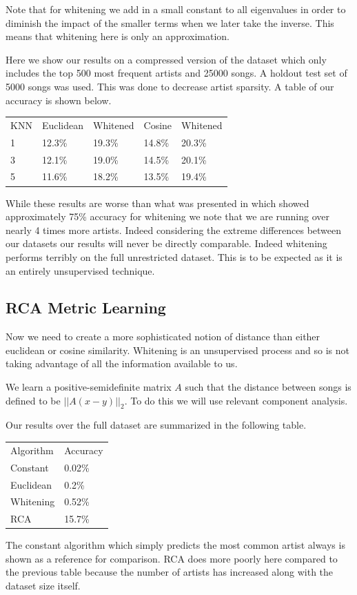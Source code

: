 \documentclass[a4paper,10pt]{article}
\begin{document}
Note that for whitening we add in a small constant to all eigenvalues in order to diminish the impact of the smaller terms when we later take the inverse. This means that whitening here is only an approximation. 

Here we show our results on a compressed version of the dataset which only includes the top 500 most frequent artists and 25000 songs. A holdout test set of 5000 songs was used. This was done to decrease artist sparsity. A table of our accuracy is shown below.
\label{Foo} 
\begin{center}
\begin{tabular}{lllll}
KNN & Euclidean & Whitened & Cosine & Whitened\\
1 & 12.3\% & 19.3\% & 14.8\% & 20.3\%\\
3 & 12.1\% & 19.0\% & 14.5\% & 20.1\% \\
5 & 11.6\% & 18.2\% & 13.5\% & 19.4\% 
\end{tabular}
\end{center}
While these results are worse than what was presented in \cite{Slaney_learninga} which showed approximately 75\% accuracy for whitening we note that we are running over nearly 4 times more artists. Indeed considering the extreme differences between our datasets our results will never be directly comparable. Indeed whitening performs terribly on the full unrestricted dataset. This is to be expected as it is an entirely unsupervised technique.
\subsection{RCA Metric Learning}
Now we need to create a more sophisticated notion of distance than either euclidean or cosine similarity. Whitening is an unsupervised process and so is not taking advantage of all the information available to us. 

We learn a positive-semidefinite matrix $A$ such that the distance between songs is defined to be $||A(x-y)||_2$. To do this we will use relevant component analysis.



Our results over the full dataset are summarized in the following table.

\begin{center}
\begin{tabular}{ll}
Algorithm & Accuracy \\
Constant & 0.02\% \\
Euclidean & 0.2\% \\
Whitening & 0.52\% \\
RCA & 15.7\%
\end{tabular}
\end{center}
The constant algorithm which simply predicts the most common artist always is shown as a reference for comparison. RCA does more poorly here compared to the previous table because the number of artists has increased along with the dataset size itself. 
\end{document}
